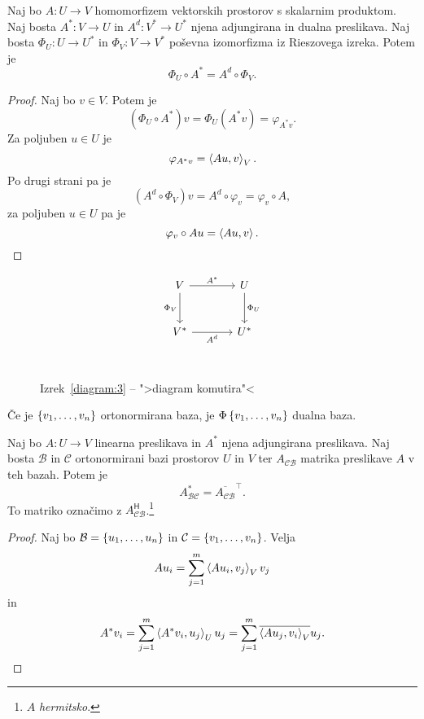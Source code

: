 \documentclass[12pt, a4paper]{article}
\begin{document}
\begin{izrek}\label{diagram:3}
Naj bo $A\colon U\to V$ homomorfizem vektorskih prostorov s skalarnim produktom. Naj bosta $A^*\colon V\to U$ in $A^d\colon V^*\to U^*$ njena adjungirana in dualna preslikava. Naj bosta $\Phi_U\colon U\to U^*$ in $\Phi_V\colon V\to V^*$ poševna izomorfizma iz Rieszovega izreka. Potem je
\[
\Phi_U\circ A^*=A^d\circ \Phi_V.
\]
\end{izrek}

\begin{proof}
Naj bo $v\in V$. Potem je
\[
\left(\Phi_U\circ A^*\right)v=\Phi_U\left(A^*v\right)=\varphi_{A^*v}.
\]
Za poljuben $u\in U$ je
\[
\varphi_{A^*v}=\left\langle Au,v\right\rangle_V.
\]
Po drugi strani pa je
\[
\left(A^d\circ \Phi_V\right)v=A^d\circ\varphi_v=\varphi_v\circ A,
\]
za poljuben $u\in U$ pa je
\[
\varphi_v\circ Au=\left\langle Au,v\right\rangle.\qedhere
\]
\end{proof}

\begin{figure}[H]
\[
\begin{tikzcd}[column sep=large, row sep=large]
V
\arrow[r, "A^*"]
\arrow[d, "\Phi_V"'] & U \arrow[d, "\Phi_U"] \\
V^* \arrow[r, "A^d"'] & U^*
\end{tikzcd}
\]
\vspace{-20pt}\\
\caption{Izrek~\ref{diagram:3} -- ">diagram komutira"<}
\end{figure}

\begin{trditev}
Če je $\left\{v_1,\dots,v_n\right\}$ ortonormirana baza, je $\Phi\left\{v_1,\dots,v_n\right\}$ dualna baza.
\end{trditev}

\obvs

\begin{izrek}
Naj bo $A\colon U\to V$ linearna preslikava in $A^*$ njena adjungirana preslikava. Naj bosta $\mathcal{B}$ in $\mathcal{C}$ ortonormirani bazi prostorov $U$ in $V$ ter $A_{\mathcal{CB}}$ matrika preslikave $A$ v teh bazah. Potem je
\[
A^*_{\mathcal{BC}}=\overline{A_{\mathcal{CB}}}^\top.
\]
To matriko označimo z $A_{\mathcal{CB}}^{\mathsf{H}}$.\footnote{$A$ \emph{hermitsko}.}
\end{izrek}

\begin{proof}
Naj bo $\mathcal{B}=\left\{u_1,\dots,u_n\right\}$ in $\mathcal{C}=\left\{v_1,\dots,v_n\right\}$. Velja
\[
Au_i=\sum_{j=1}^m\left\langle Au_i,v_j\right\rangle_Vv_j
\]
in
\[
A^*v_i=\sum_{j=1}^m\left\langle A^*v_i,u_j\right\rangle_Uu_j=\sum_{j=1}^m\overline{\left\langle Au_j,v_i\right\rangle_V}u_j.\qedhere
\]
\end{proof}
\end{document}
